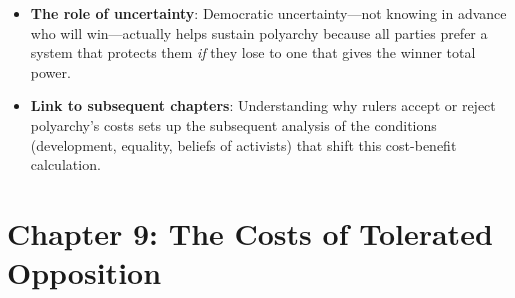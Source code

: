 \documentclass[12pt]{article}
\begin{document}
\begin{itemize}[leftmargin=*, itemsep=4pt]
    \item \textbf{The role of uncertainty}: Democratic uncertainty---not knowing in advance who will win---actually helps sustain polyarchy because all parties prefer a system that protects them \emph{if} they lose to one that gives the winner total power.
    \item \textbf{Link to subsequent chapters}: Understanding why rulers accept or reject polyarchy's costs sets up the subsequent analysis of the conditions (development, equality, beliefs of activists) that shift this cost-benefit calculation.
\end{itemize}

\section{Chapter 9: The Costs of Tolerated Opposition}
\end{document}
